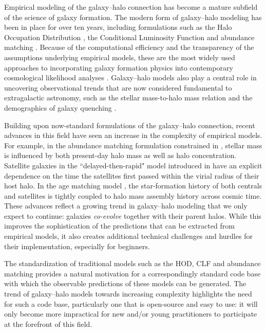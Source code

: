 \documentclass[twocolumn, tighten]{aastex6}
\begin{document}
Empirical modeling of the galaxy--halo connection has become a mature subfield of the science of galaxy formation. The modern form of galaxy--halo modeling has been in place for over ten years, including formulations such as the Halo Occupation Distribution \citep[HOD, ][]{berlind02}, the Conditional Luminosity Function \citep[CLF,][]{yang03} and abundance matching \citep{kravtsov04a}. Because of the computational efficiency and the transparency of the assumptions underlying empirical models, these are the most widely used approaches to incorporating galaxy formation physics into contemporary cosmological likelihood analyses \citep[e.g.,][]{cacciato_etal13, reid_etal14}. Galaxy--halo models also play a central role in uncovering observational trends that are now considered fundamental to extragalactic astronomy, such as the stellar mass-to-halo mass relation \citep{tinker05, vdBosch07, behroozi10, moster10, leauthaud_etal12} and the demographics of galaxy quenching \citep{vdBosch03a, collister05, behroozi13b, tinker_etal13}.

Building upon now-standard formulations of the galaxy--halo connection, recent advances in this field have seen an increase in the complexity of empirical models. For example, in the abundance matching formulation constrained in \citet{lehmann_etal15}, stellar mass is influenced by both present-day halo mass as well as halo concentration. Satellite galaxies in the ``delayed-then-rapid" model introduced in \citet{wetzel_etal12b} have an explicit dependence on the time the satellites first passed within the virial radius of their host halo. In the age matching model \citep{HW13a}, the star-formation history of both centrals and satellites is tightly coupled to halo mass assembly history across cosmic time. These advances reflect a growing trend in galaxy--halo modeling that we only expect to continue: galaxies {\em co-evolve} together with their parent halos. While this improves the sophistication of the predictions that can be extracted from empirical models, it also creates additional technical challenges and hurdles for their implementation, especially for beginners.

The standardization of traditional models such as the HOD, CLF and abundance matching provides a natural motivation for a correspondingly standard code base with which the observable predictions of these models can be generated. The trend of galaxy--halo models towards increasing complexity highlights the need for such a code base, particularly one that is open-source and easy to use: it will only become more impractical for new and/or young practitioners to participate at the forefront of this field. 
\end{document}
